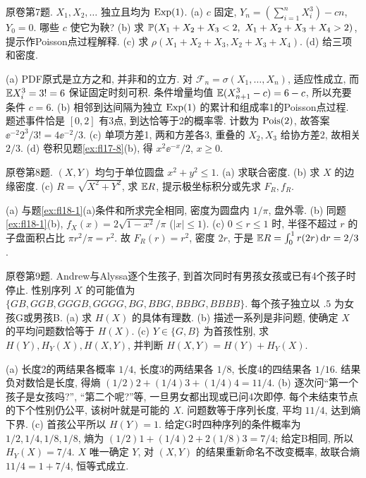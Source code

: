 \begin{exercise}\label{ex:fl19-7}
原卷第7题. $X_1,X_2,\ldots$ 独立且均为 $\operatorname{Exp}(1)$. (a) $c$ 固定, $Y_n=(\sum_{i=1}^nX_i^3)-cn$, $Y_0=0$. 哪些 $c$ 使它为鞅? (b) 求 $\Prob(X_1+X_2+X_3<2,\ X_1+X_2+X_3+X_4>2)$, 提示作Poisson点过程解释. (c) 求 $\rho(X_1+X_2+X_3,X_2+X_3+X_4)$. (d) 给三项和密度.
\end{exercise}
\begin{solution}
(a)\label{sol:fl19-7-a} PDF原式是立方之和, 并非和的立方. 对 $\mathcal F_n=\sigma(X_1,\ldots,X_n)$, 适应性成立, 而 $\mathbb E X_i^3=3!=6$ 保证固定时刻可积. 条件增量均值 $\mathbb E(X_{n+1}^3-c)=6-c$, 所以充要条件 $c=6$.
(b)\label{sol:fl19-7-b} 相邻到达间隔为独立 $\operatorname{Exp}(1)$ 的累计和组成率1的Poisson点过程. 题述事件恰是 $[0,2]$ 有3点, 到达恰等于2的概率零. 计数为 $\operatorname{Pois}(2)$, 故答案 $\ee^{-2}2^3/3!=4\ee^{-2}/3$.
(c)\label{sol:fl19-7-c} 单项方差1, 两和方差各3, 重叠的 $X_2,X_3$ 给协方差2, 故相关 $2/3$.
(d)\label{sol:fl19-7-d} 卷积见题\ref{ex:fl17-8}(b), 得 $x^2\ee^{-x}/2$, $x\geq0$.
\end{solution}

\begin{exercise}\label{ex:fl19-8}
原卷第8题. $(X,Y)$ 均匀于单位圆盘 $x^2+y^2\leq1$. (a) 求联合密度. (b) 求 $X$ 的边缘密度. (c) $R=\sqrt{X^2+Y^2}$, 求 $\mathbb E R$, 提示极坐标积分或先求 $F_R,f_R$.
\end{exercise}
\begin{solution}
(a)\label{sol:fl19-8-a} 与题\ref{ex:fl18-1}(a)条件和所求完全相同, 密度为圆盘内 $1/\pi$, 盘外零.
(b)\label{sol:fl19-8-b} 同题\ref{ex:fl18-1}(b), $f_X(x)=2\sqrt{1-x^2}/\pi$ ($|x|\leq1$).
(c)\label{sol:fl19-8-c} $0\leq r\leq1$ 时, 半径不超过 $r$ 的子盘面积占比 $\pi r^2/\pi=r^2$. 故 $F_R(r)=r^2$, 密度 $2r$, 于是 $\mathbb E R=\int_0^1r(2r)\,\mathrm d r=2/3$.
\end{solution}

\begin{exercise}\label{ex:fl19-9}
原卷第9题. Andrew与Alyssa逐个生孩子, 到首次同时有男孩女孩或已有4个孩子时停止. 性别序列 $X$ 的可能值为 $\{GB,GGB,GGGB,GGGG,BG,BBG,BBBG,BBBB\}$. 每个孩子独立以 $.5$ 为女孩G或男孩B. (a) 求 $H(X)$ 的具体有理数. (b) 描述一系列是非问题, 使确定 $X$ 的平均问题数恰等于 $H(X)$. (c) $Y\in\{G,B\}$ 为首孩性别, 求 $H(Y),H_Y(X),H(X,Y)$, 并判断 $H(X,Y)=H(Y)+H_Y(X)$.
\end{exercise}
\begin{solution}
(a)\label{sol:fl19-9-a} 长度2的两结果各概率 $1/4$, 长度3的两结果各 $1/8$, 长度4的四结果各 $1/16$. 结果负对数恰是长度, 得熵 $(1/2)2+(1/4)3+(1/4)4=11/4$.
(b)\label{sol:fl19-9-b} 逐次问``第一个孩子是女孩吗?'', ``第二个呢?''等, 一旦男女都出现或已问4次即停. 每个未结束节点的下个性别仍公平, 该树叶就是可能的 $X$. 问题数等于序列长度, 平均 $11/4$, 达到熵下界.
(c)\label{sol:fl19-9-c} 首孩公平所以 $H(Y)=1$. 给定G时四种序列的条件概率为 $1/2,1/4,1/8,1/8$, 熵为 $(1/2)1+(1/4)2+2(1/8)3=7/4$; 给定B相同, 所以 $H_Y(X)=7/4$. $X$ 唯一确定 $Y$, 对 $(X,Y)$ 的结果重新命名不改变概率, 故联合熵 $11/4=1+7/4$, 恒等式成立.
\end{solution}

